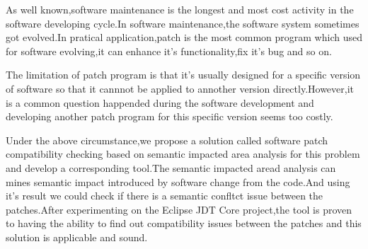 \begin{eabstract} 
		As well known,software maintenance is the longest and most cost activity in the software developing cycle.In software maintenance,the software system sometimes got evolved.In pratical application,patch is the most common program which used for software evolving,it can enhance it's functionality,fix it's bug and so on.
		
		The limitation of patch program is that it's usually designed for a specific version of software so that it cannnot be applied to annother version directly.However,it is a common question happended during the software development and developing another patch program for this specific version seems too costly.
		
		Under the above circumstance,we propose a solution called software patch compatibility checking based on semantic impacted area analysis for this problem and develop a corresponding tool.The semantic impacted aread analysis can mines semantic impact introduced by software change from the code.And using it's result we could check if there is a semantic confltct issue between the patches.After experimenting on the Eclipse JDT Core project,the tool is proven to having the ability to find out compatibility issues between the patches and this solution is applicable and sound.  
		
		
\end{eabstract}


